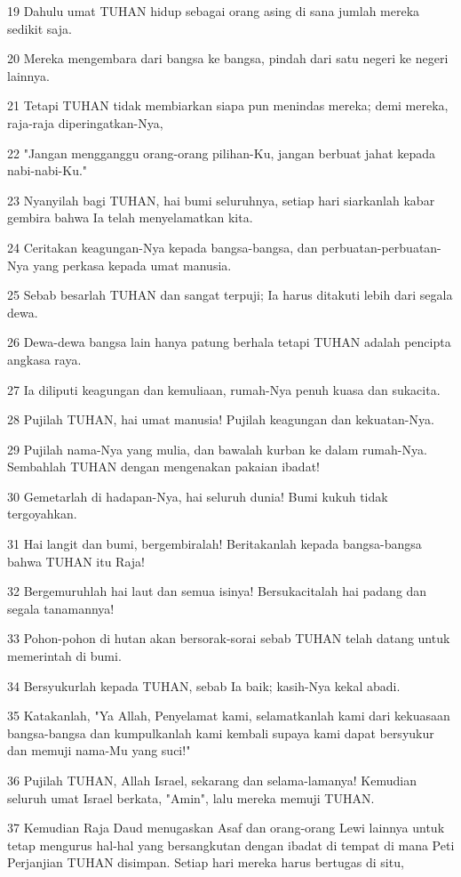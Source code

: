 \par 19 Dahulu umat TUHAN hidup sebagai orang asing di sana jumlah mereka sedikit saja.
\par 20 Mereka mengembara dari bangsa ke bangsa, pindah dari satu negeri ke negeri lainnya.
\par 21 Tetapi TUHAN tidak membiarkan siapa pun menindas mereka; demi mereka, raja-raja diperingatkan-Nya,
\par 22 "Jangan mengganggu orang-orang pilihan-Ku, jangan berbuat jahat kepada nabi-nabi-Ku."
\par 23 Nyanyilah bagi TUHAN, hai bumi seluruhnya, setiap hari siarkanlah kabar gembira bahwa Ia telah menyelamatkan kita.
\par 24 Ceritakan keagungan-Nya kepada bangsa-bangsa, dan perbuatan-perbuatan-Nya yang perkasa kepada umat manusia.
\par 25 Sebab besarlah TUHAN dan sangat terpuji; Ia harus ditakuti lebih dari segala dewa.
\par 26 Dewa-dewa bangsa lain hanya patung berhala tetapi TUHAN adalah pencipta angkasa raya.
\par 27 Ia diliputi keagungan dan kemuliaan, rumah-Nya penuh kuasa dan sukacita.
\par 28 Pujilah TUHAN, hai umat manusia! Pujilah keagungan dan kekuatan-Nya.
\par 29 Pujilah nama-Nya yang mulia, dan bawalah kurban ke dalam rumah-Nya. Sembahlah TUHAN dengan mengenakan pakaian ibadat!
\par 30 Gemetarlah di hadapan-Nya, hai seluruh dunia! Bumi kukuh tidak tergoyahkan.
\par 31 Hai langit dan bumi, bergembiralah! Beritakanlah kepada bangsa-bangsa bahwa TUHAN itu Raja!
\par 32 Bergemuruhlah hai laut dan semua isinya! Bersukacitalah hai padang dan segala tanamannya!
\par 33 Pohon-pohon di hutan akan bersorak-sorai sebab TUHAN telah datang untuk memerintah di bumi.
\par 34 Bersyukurlah kepada TUHAN, sebab Ia baik; kasih-Nya kekal abadi.
\par 35 Katakanlah, "Ya Allah, Penyelamat kami, selamatkanlah kami dari kekuasaan bangsa-bangsa dan kumpulkanlah kami kembali supaya kami dapat bersyukur dan memuji nama-Mu yang suci!"
\par 36 Pujilah TUHAN, Allah Israel, sekarang dan selama-lamanya! Kemudian seluruh umat Israel berkata, "Amin", lalu mereka memuji TUHAN.
\par 37 Kemudian Raja Daud menugaskan Asaf dan orang-orang Lewi lainnya untuk tetap mengurus hal-hal yang bersangkutan dengan ibadat di tempat di mana Peti Perjanjian TUHAN disimpan. Setiap hari mereka harus bertugas di situ,
